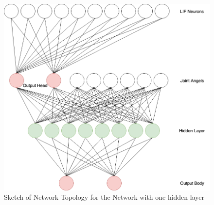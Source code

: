 \begin{figure}[htpb]
  \centering
  \includegraphics[width=\textwidth]{figures/plots/M1NetworkTop}
  \caption{ Sketch of Network Topology for the Network with one hidden layer  }
  \label{fig:M1netTop}
\end{figure}





